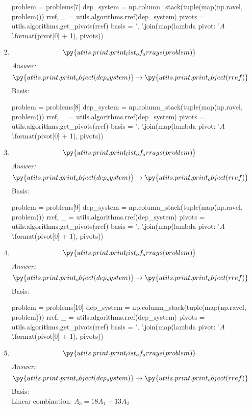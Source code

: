 \documentclass[letterpaper]{article}
\newcommand{\ans}{\textit{Answer: }}
\newenvironment{question}[2][Question]{\begin{trivlist}
\item[\hskip \labelsep {\bfseries #1}\hskip \labelsep {\bfseries #2.}]}{\end{trivlist}}
\newcommand{\printobj}[1]{\py{utils.print.print_object(#1)}}
\begin{document}
\begin{question}{2.1}
\begin{enumerate}[label=\textbf{(\alph*)}]
    \begin{pycode}
problem = problems[7]
dep_system = np.column_stack(tuple(map(np.ravel, problem)))
rref, _ = utils.algorithms.rref(dep_system)
pivots = utils.algorithms.get_pivots(rref)
basis = ', '.join(map(lambda pivot: '$A_{}$'.format(pivot[0] + 1), pivots))
    \end{pycode}
    \item
    $$\py{utils.print.print_list_of_arrays(problem)}$$
    \ans 
    $$\printobj{dep_system} \rightarrow \printobj{rref}$$
    Basis:  \\
    \begin{pycode}
problem = problems[8]
dep_system = np.column_stack(tuple(map(np.ravel, problem)))
rref, _ = utils.algorithms.rref(dep_system)
pivots = utils.algorithms.get_pivots(rref)
basis = ', '.join(map(lambda pivot: '$A_{}$'.format(pivot[0] + 1), pivots))
    \end{pycode}
    \item
    $$\py{utils.print.print_list_of_arrays(problem)}$$
    \ans 
    $$\printobj{dep_system} \rightarrow \printobj{rref}$$
    Basis:  \\
    \begin{pycode}
problem = problems[9]
dep_system = np.column_stack(tuple(map(np.ravel, problem)))
rref, _ = utils.algorithms.rref(dep_system)
pivots = utils.algorithms.get_pivots(rref)
basis = ', '.join(map(lambda pivot: '$A_{}$'.format(pivot[0] + 1), pivots))
    \end{pycode}
    \item
    $$\py{utils.print.print_list_of_arrays(problem)}$$
    \ans 
    $$\printobj{dep_system} \rightarrow \printobj{rref}$$
    Basis:  \\
    \begin{pycode}
problem = problems[10]
dep_system = np.column_stack(tuple(map(np.ravel, problem)))
rref, _ = utils.algorithms.rref(dep_system)
pivots = utils.algorithms.get_pivots(rref)
basis = ', '.join(map(lambda pivot: '$A_{}$'.format(pivot[0] + 1), pivots))
    \end{pycode}
    \item
    $$\py{utils.print.print_list_of_arrays(problem)}$$
    \ans 
    $$\printobj{dep_system} \rightarrow \printobj{rref}$$
    Basis:  \\
    Linear combination: $A_3 = 18A_1 + 13A_2$ \\
\end{enumerate}
\end{question}
\end{document}
